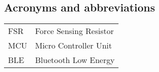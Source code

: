 \subsection*{Acronyms and abbreviations}

\begingroup
\renewcommand{\arraystretch}{1.2}
\begin{tabular}{@{}p{2.5cm} l}
    FSR     & Force Sensing Resistor\\
    MCU     & Micro Controller Unit\\
    BLE     & Bluetooth Low Energy\\

\end{tabular}
\endgroup
